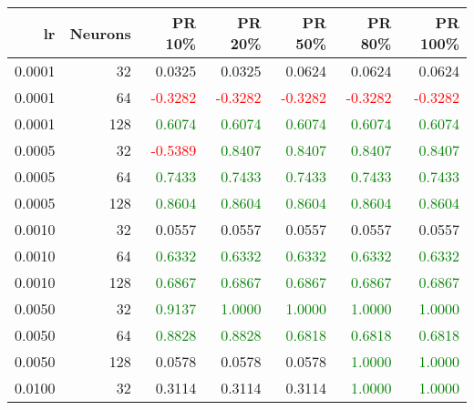 \begin{tabular}{rrrrrrr}
\toprule
lr & Neurons & PR 10\% & PR 20\% & PR 50\% & PR 80\% & PR 100\% \\
\midrule
0.0001 & 32 & \textcolor{blu} {0.0325} & \textcolor{blu} {0.0325} & \textcolor{blu} {0.0624} & \textcolor{blu} {0.0624} & \textcolor{blu} {0.0624} \\
0.0001 & 64 & \textcolor{red} {-0.3282} & \textcolor{red} {-0.3282} & \textcolor{red} {-0.3282} & \textcolor{red} {-0.3282} & \textcolor{red} {-0.3282} \\
0.0001 & 128 & \textcolor{green} {0.6074} & \textcolor{green} {0.6074} & \textcolor{green} {0.6074} & \textcolor{green} {0.6074} & \textcolor{green} {0.6074} \\
0.0005 & 32 & \textcolor{red} {-0.5389} & \textcolor{green} {0.8407} & \textcolor{green} {0.8407} & \textcolor{green} {0.8407} & \textcolor{green} {0.8407} \\
0.0005 & 64 & \textcolor{green} {0.7433} & \textcolor{green} {0.7433} & \textcolor{green} {0.7433} & \textcolor{green} {0.7433} & \textcolor{green} {0.7433} \\
0.0005 & 128 & \textcolor{green} {0.8604} & \textcolor{green} {0.8604} & \textcolor{green} {0.8604} & \textcolor{green} {0.8604} & \textcolor{green} {0.8604} \\
0.0010 & 32 & \textcolor{blu} {0.0557} & \textcolor{blu} {0.0557} & \textcolor{blu} {0.0557} & \textcolor{blu} {0.0557} & \textcolor{blu} {0.0557} \\
0.0010 & 64 & \textcolor{green} {0.6332} & \textcolor{green} {0.6332} & \textcolor{green} {0.6332} & \textcolor{green} {0.6332} & \textcolor{green} {0.6332} \\
0.0010 & 128 & \textcolor{green} {0.6867} & \textcolor{green} {0.6867} & \textcolor{green} {0.6867} & \textcolor{green} {0.6867} & \textcolor{green} {0.6867} \\
0.0050 & 32 & \textcolor{green} {0.9137} & \textcolor{green} {1.0000} & \textcolor{green} {1.0000} & \textcolor{green} {1.0000} & \textcolor{green} {1.0000} \\
0.0050 & 64 & \textcolor{green} {0.8828} & \textcolor{green} {0.8828} & \textcolor{green} {0.6818} & \textcolor{green} {0.6818} & \textcolor{green} {0.6818} \\
0.0050 & 128 & \textcolor{blu} {0.0578} & \textcolor{blu} {0.0578} & \textcolor{blu} {0.0578} & \textcolor{green} {1.0000} & \textcolor{green} {1.0000} \\
0.0100 & 32 & \textcolor{blu} {0.3114} & \textcolor{blu} {0.3114} & \textcolor{blu} {0.3114} & \textcolor{green} {1.0000} & \textcolor{green} {1.0000} \\

\end{tabular}
